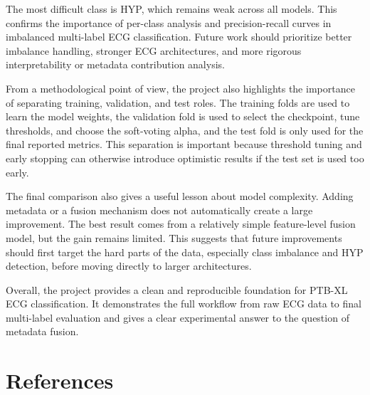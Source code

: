 \documentclass[11pt,a4paper]{article}
\begin{document}
The most difficult class is HYP, which remains weak across all models. This confirms the importance of per-class analysis and precision-recall curves in imbalanced multi-label ECG classification. Future work should prioritize better imbalance handling, stronger ECG architectures, and more rigorous interpretability or metadata contribution analysis.

From a methodological point of view, the project also highlights the importance of separating training, validation, and test roles. The training folds are used to learn the model weights, the validation fold is used to select the checkpoint, tune thresholds, and choose the soft-voting alpha, and the test fold is only used for the final reported metrics. This separation is important because threshold tuning and early stopping can otherwise introduce optimistic results if the test set is used too early.

The final comparison also gives a useful lesson about model complexity. Adding metadata or a fusion mechanism does not automatically create a large improvement. The best result comes from a relatively simple feature-level fusion model, but the gain remains limited. This suggests that future improvements should first target the hard parts of the data, especially class imbalance and HYP detection, before moving directly to larger architectures.

Overall, the project provides a clean and reproducible foundation for PTB-XL ECG classification. It demonstrates the full workflow from raw ECG data to final multi-label evaluation and gives a clear experimental answer to the question of metadata fusion.

\clearpage
\section*{References}
\end{document}

